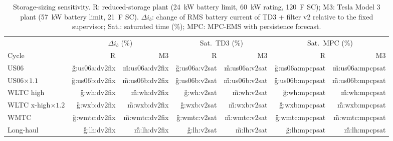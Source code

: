 \begin{table}[t]
\centering\footnotesize\setlength{\tabcolsep}{2pt}
\caption{Storage-sizing sensitivity. R: reduced-storage plant (\SI{24}{kW} battery limit, \SI{60}{kW} rating, \SI{120}{F} SC); M3: Tesla Model 3 plant (\SI{57}{kW} battery limit, \SI{21}{F} SC). $\Delta i_b$: change of RMS battery current of TD3 + filter v2 relative to the fixed supervisor; Sat.: saturated time (\%); MPC: MPC-EMS with persistence forecast.}
\label{tab:sizing}
\begin{tabular}{@{}lrrrrrr@{}}
\toprule
 & \multicolumn{2}{c}{$\Delta i_b$ (\%)} & \multicolumn{2}{c}{Sat.\ TD3 (\%)} & \multicolumn{2}{c}{Sat.\ MPC (\%)}\\
Cycle & R & M3 & R & M3 & R & M3\\
\midrule
US06 & \G{g:us06a:dv2fix} & \G{m:us06a:dv2fix} & \G{g:us06a:v2sat} & \G{m:us06a:v2sat} & \G{g:us06a:mpcpsat} & \G{m:us06a:mpcpsat}\\
US06$\times1.1$ & \G{g:us06b:dv2fix} & \G{m:us06b:dv2fix} & \G{g:us06b:v2sat} & \G{m:us06b:v2sat} & \G{g:us06b:mpcpsat} & \G{m:us06b:mpcpsat}\\
WLTC high & \G{g:wh:dv2fix} & \G{m:wh:dv2fix} & \G{g:wh:v2sat} & \G{m:wh:v2sat} & \G{g:wh:mpcpsat} & \G{m:wh:mpcpsat}\\
WLTC x-high$\times1.2$ & \G{g:wxb:dv2fix} & \G{m:wxb:dv2fix} & \G{g:wxb:v2sat} & \G{m:wxb:v2sat} & \G{g:wxb:mpcpsat} & \G{m:wxb:mpcpsat}\\
WMTC & \G{g:wmtc:dv2fix} & \G{m:wmtc:dv2fix} & \G{g:wmtc:v2sat} & \G{m:wmtc:v2sat} & \G{g:wmtc:mpcpsat} & \G{m:wmtc:mpcpsat}\\
Long-haul & \G{g:lh:dv2fix} & \G{m:lh:dv2fix} & \G{g:lh:v2sat} & \G{m:lh:v2sat} & \G{g:lh:mpcpsat} & \G{m:lh:mpcpsat}\\
\bottomrule
\end{tabular}
\end{table}
